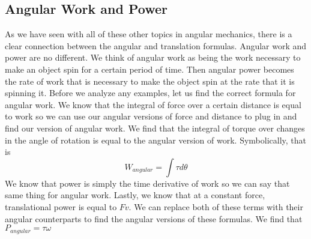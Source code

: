 \documentclass{article}[gray]
\numberwithin{equation}{subsection}
\begin{document}
\subsection{Angular Work and Power}
As we have seen with all of these other topics in angular mechanics, there is a clear connection between the angular and translation formulas. Angular work and power are no different. We think of angular work as being the work necessary to make an object spin for a certain period of time. Then angular power becomes the rate of work that is necessary to make the object spin at the rate that it is spinning it. Before we analyze any examples, let us find the correct formula for angular work. We know that the integral of force over a certain distance is equal to work so we can use our angular versions of force and distance to plug in and find our version of angular work. We find that the integral of torque over changes in the angle of rotation is equal to the angular version of work. Symbolically, that is \begin{equation}W_{angular} = \int \tau d\theta\end{equation}
We know that power is simply the time derivative of work so we can say that same thing for angular work. Lastly, we know that at a constant force, translational power is equal to $Fv$. We can replace both of these terms with their angular counterparts to find the angular versions of these formulas. We find that $P_{angular} = \tau \omega$
\end{document}
